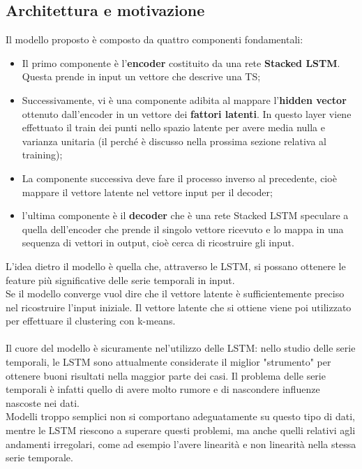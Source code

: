 \subsection{Architettura e motivazione}
Il modello proposto è composto da quattro componenti fondamentali:
\begin{itemize}
	\item Il primo componente è l'\textbf{encoder} costituito da una rete \textbf{Stacked LSTM}. Questa prende in input un vettore che descrive una TS;
	\item Successivamente, vi è una componente adibita al mappare l'\textbf{hidden vector} ottenuto dall'encoder in un vettore dei \textbf{fattori latenti}. In questo layer viene effettuato il train dei punti nello spazio latente per avere media nulla e varianza unitaria (il perché è discusso nella prossima sezione relativa al training);
	\item La componente successiva deve fare il processo inverso al precedente, cioè mappare il vettore latente nel vettore input per il decoder;
	\item l'ultima componente è il \textbf{decoder} che è una rete Stacked LSTM speculare a quella dell'encoder che prende il singolo vettore ricevuto e lo mappa in una sequenza di vettori in output, cioè cerca di ricostruire gli input.
\end{itemize}

L'idea dietro il modello è quella che, attraverso le LSTM, si possano ottenere le feature più significative delle serie temporali in input.\\
Se il modello converge vuol dire che il vettore latente è sufficientemente preciso nel ricostruire l'input iniziale. Il vettore latente che si ottiene viene poi utilizzato per effettuare il clustering con k-means.\\
\\
Il cuore del modello è sicuramente nel'utilizzo delle LSTM: nello studio delle serie temporali, le LSTM sono attualmente considerate il miglior "strumento" per ottenere buoni risultati nella maggior parte dei casi. Il problema delle serie temporali è infatti quello di avere molto rumore e di nascondere influenze nascoste nei dati.\\
Modelli troppo semplici non si comportano adeguatamente su questo tipo di dati, mentre le LSTM riescono a superare questi problemi, ma anche quelli relativi agli andamenti irregolari, come ad esempio l'avere linearità e non linearità nella stessa serie temporale.

